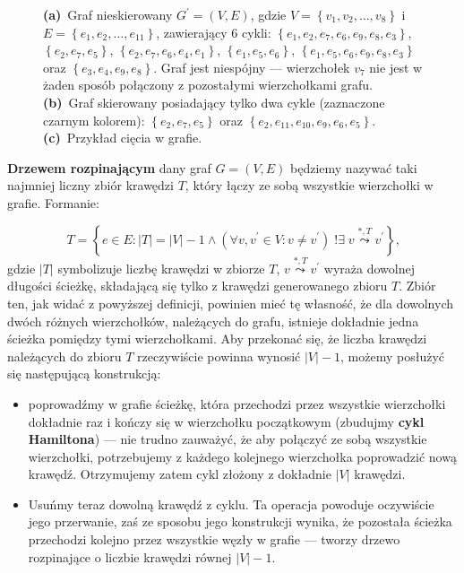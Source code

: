 \begin{figure}[!htbp]
\begin{subfigure}[b]{0.32\textwidth}
		\caption{}
		\label{fig:defExample:c}
	\end{subfigure}
	\hfill\null
	\caption{
		\textbf{(a)}~Graf nieskierowany $G^{\prime} = \left( V, E \right)$, gdzie $V = \left\{ v_{1}, v_{2}, \dots, v_{8} \right\}$ i $E = \left\{ e_{1}, e_{2}, \dots, e_{11} \right\}$, zawierający $6$ cykli: $\left\{ e_{1}, e_{2}, e_{7}, e_{6}, e_{9}, e_{8}, e_{3} \right\}$, $\left\{ e_{2}, e_{7}, e_{5} \right\}$, $\left\{ e_{2}, e_{7}, e_{6}, e_{4}, e_{1} \right\}$, $\left\{ e_{1}, e_{5}, e_{6} \right\}$, $\left\{ e_{1}, e_{5}, e_{6}, e_{9}, e_{8}, e_{3} \right\}$ oraz $\left\{ e_{3}, e_{4}, e_{9}, e_{8} \right\}$. Graf jest niespójny --- wierzchołek $v_{7}$ nie jest w żaden sposób połączony z pozostałymi wierzchołkami grafu.
		\textbf{(b)}~Graf skierowany posiadający tylko dwa cykle (zaznaczone czarnym kolorem): $\left\{ e_{2}, e_{7}, e_{5} \right\}$ oraz $\left\{ e_{2}, e_{11}, e_{10}, e_{9}, e_{6}, e_{5} \right\}$.
		\textbf{(c)}~Przykład cięcia w grafie.
	}
	\label{fig:defExample}
\end{figure}

\textbf{Drzewem rozpinającym} dany graf $G = \left( V, E \right)$ będziemy nazywać taki najmniej liczny zbiór krawędzi $T$, który łączy ze sobą wszystkie wierzchołki w grafie. Formanie:

\begin{equation}
	T = \left\{ e \in E : \left| T \right| = \left| V \right| - 1 \wedge \left( \forall v, v^{\prime} \in V : v \neq v^{\prime} \right) \; !\exists \; v \overset{\ast, T}{\leadsto} v^{\prime} \right\}\text{,}
\end{equation}
gdzie $\left| T \right|$ symbolizuje liczbę krawędzi w zbiorze $T$, $v \overset{\ast, T}{\leadsto} v^{\prime}$ wyraża dowolnej długości ścieżkę, składającą się tylko z krawędzi generowanego zbioru $T$. Zbiór ten, jak widać z powyższej definicji, powinien mieć tę własność, że dla dowolnych dwóch różnych wierzchołków, należących do grafu, istnieje dokładnie jedna ścieżka pomiędzy tymi wierzchołkami. Aby przekonać się, że liczba krawędzi należących do zbioru $T$ rzeczywiście powinna wynosić $\left| V \right| - 1$, możemy posłużyć się następującą konstrukcją:

\begin{itemize}
	\item poprowadźmy w grafie ścieżkę, która przechodzi przez wszystkie wierzchołki dokładnie raz i kończy się w wierzchołku początkowym (zbudujmy \textbf{cykl Hamiltona}) --- nie trudno zauważyć, że aby połączyć ze sobą wszystkie wierzchołki, potrzebujemy z każdego kolejnego wierzchołka poprowadzić nową krawędź. Otrzymujemy zatem cykl złożony z dokładnie $\left| V \right|$ krawędzi.
	\item Usuńmy teraz dowolną krawędź z cyklu. Ta operacja powoduje oczywiście jego przerwanie, zaś ze sposobu jego konstrukcji wynika, że pozostała ścieżka przechodzi kolejno przez wszystkie węzły w grafie --- tworzy drzewo rozpinające o liczbie krawędzi równej $\left| V \right| - 1$.
\end{itemize}

